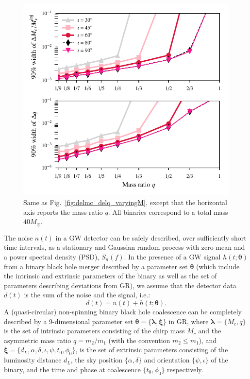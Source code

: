 \documentclass[prd,preprintnumbers,twocolumn,eqsecnum,floatfix,a4paper,nofootinbib,superscriptaddress]{revtex4}
\newcommand{\blambda}{\bm{\lambda}}
\newcommand{\btheta}{\bm{\theta}}
\newcommand{\bxi}{\bm{\xi}}
\begin{document}
 \begin{figure}[tbh]
 	\begin{center}
 		\includegraphics[scale=0.8]{figs/hm_9dim_dmcbymcinj_dq_diff_q.pdf}
 	\end{center} 
 	\caption{Same as Fig.~\ref{fig:delmc_delq_varyingM}, except that the horizontal axis reports the mass ratio $q$. All binaries correspond to a total mass $40M_{\odot}$.}
 	\label{fig:delmc_delq_varyingq}
 \end{figure}

The noise $n(t)$ in a GW detector can be safely described, over sufficiently short time intervals, as a stationary and Gaussian random process with zero mean and a power spectral density (PSD), $S_n(f)$. In the presence of a GW signal $h(t; \btheta)$ from a binary black hole merger described by a parameter set $\btheta$ (which include the intrinsic and extrinsic parameters of the binary as well as the set of parameters describing deviations from GR), we assume that the detector data $d(t)$ is the sum of the noise and the signal, i.e.:
\begin{equation}
d(t) = n(t) + h(t; \btheta). 
\end{equation}
A (quasi-circular) non-spinning binary black hole coalescence can be completely described by a 9-dimensional parameter set $\btheta = \{ \blambda, \bxi\}$ in GR, where $\blambda = \{ M_c, q \}$ is the set of intrinsic parameters consisting of the chirp mass $M_c$ and the asymmetric mass ratio $q = m_2/m_1$ (with the convention $m_2 \leq m_1$), and $\bxi = \{ d_L, \alpha, \delta, \iota, \psi, t_0, \phi_0 \}$, is the set of extrinsic parameters consisting of the luminosity distance $d_L$, the sky position $\{\alpha, \delta\}$ and orientation $\{\psi, \iota\}$ of the binary, and the time and phase at coalescence $\{t_0, \phi_0\}$ respectively.
\end{document}
